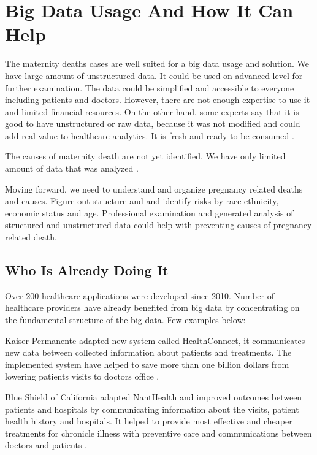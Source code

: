 \documentclass[sigconf]{acmart}
\begin{document}
\section{Big Data Usage And How It Can Help}

The maternity deaths cases are well suited for a big data usage and solution. We have large amount of unstructured data. It could be used on advanced level for further examination. The data could be simplified and accessible to everyone including patients and doctors. However, there are not enough expertise to use it and limited financial resources. On the other hand, some experts say that it is good to have unstructured or raw data, because it was not modified and could add real value to healthcare analytics. It is fresh and ready to be consumed \cite{dineshkumar2016big}.

The causes of maternity death are not yet identified. We have only limited amount of data that was analyzed \cite{creanga2012race}.

Moving forward, we need to understand and organize pregnancy related deaths and causes. Figure out structure and and identify risks by race ethnicity, economic status and age. Professional examination and generated analysis of structured and unstructured data could help with preventing causes of pregnancy related death.

\subsection{Who Is Already Doing It}

Over 200 healthcare applications were developed since 2010. Number of healthcare providers have already benefited from big data by concentrating on the fundamental structure of the big data. 
Few examples below:

 Kaiser Permanente adapted new system called HealthConnect, it communicates new data between collected information about patients and treatments. The implemented system have helped to save more than one billion dollars from lowering patients visits to doctor\textquotesingle s office \cite{groves2016big}.

 Blue Shield of California adapted NantHealth and improved outcomes between patients and hospitals by communicating information about the visits, patient health history and hospitals. It helped to provide most effective and cheaper treatments for chronicle illness with preventive care and communications between doctors and patients \cite{groves2016big}.
\end{document}
